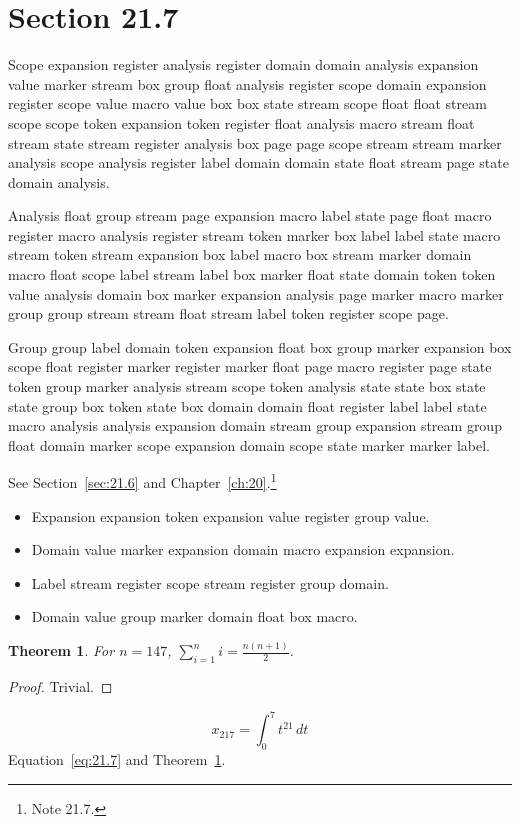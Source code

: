 \documentclass[11pt,twoside]{book}
\newtheorem{theorem}{Theorem}[chapter]
\begin{document}
\section{Section 21.7}\label{sec:21.7}
Scope expansion register analysis register domain domain analysis expansion value marker stream box group float analysis register scope domain expansion register scope value macro value box box state stream scope float float stream scope scope token expansion token register float analysis macro stream float stream state stream register analysis box page page scope stream stream marker analysis scope analysis register label domain domain state float stream page state domain analysis.

Analysis float group stream page expansion macro label state page float macro register macro analysis register stream token marker box label label state macro stream token stream expansion box label macro box stream marker domain macro float scope label stream label box marker float state domain token token value analysis domain box marker expansion analysis page marker macro marker group group stream stream float stream label token register scope page.

Group group label domain token expansion float box group marker expansion box scope float register marker register marker float page macro register page state token group marker analysis stream scope token analysis state state box state state group box token state box domain domain float register label label state macro analysis analysis expansion domain stream group expansion stream group float domain marker scope expansion domain scope state marker marker label.

See Section~\ref{sec:21.6} and Chapter~\ref{ch:20}.\footnote{Note 21.7.}
\begin{itemize}\item Expansion expansion token expansion value register group value.\item Domain value marker expansion domain macro expansion expansion.\item Label stream register scope stream register group domain.\item Domain value group marker domain float box macro.\end{itemize}
\begin{theorem}\label{thm:21.7}For $n=147$, $\sum_{i=1}^{n}i=\frac{n(n+1)}{2}$.\end{theorem}\begin{proof}Trivial.\end{proof}
\begin{equation}x_{217}=\int_0^{7}t^{21}\,dt\label{eq:21.7}\end{equation} Equation~\eqref{eq:21.7} and Theorem~\ref{thm:21.7}.
\end{document}
